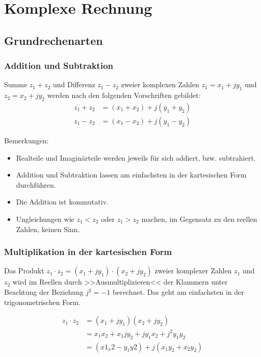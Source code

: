 \section{Komplexe Rechnung}
\subsection{Grundrechenarten}
\subsubsection*{Addition und Subtraktion}
\begin{definition}
Summe $z_1 + z_2$ und Differenz $z_1 - z_2$ zweier komplexen Zahlen $z_1 = x_1 + jy_1$ und $z_2 = x_2 + jy_2$ werden nach den folgenden Vorschriften gebildet:
\begin{align*}
z_1 + z_2 &= (x_1 + x_2) + j(y_1 + y_2)\\
z_1 - z_2 &= (x_1 - x_2) + j(y_1 - y_2)
\end{align*}
\end{definition}
Bemerkungen:
\begin{itemize}
	\item Realteile und Imaginärteile werden jeweils für sich addiert, bzw. subtrahiert.
	\item Addition und Subtraktion lassen am einfachsten in der kartesischen Form durchführen.
	\item Die Addition ist kommutativ.
	\item Ungleichungen wie $z_1 < z_2$ oder $z_1>z_2$ machen, im Gegensatz zu den reellen Zahlen, keinen Sinn.
\end{itemize}

\subsubsection*{Multiplikation in der kartesischen Form}
\begin{definition}
Das Produkt $z_1 \cdot z_2 = (x_1 + jy_1) \cdot (x_2 + jy_2)$ zweier komplexer Zahlen $z_1$ und $z_2$ wird im Reellen durch >>Ausmultiplizieren<< der Klammern unter Beachtung der Beziehung $j^2 = -1$ berechnet. Das geht am einfachsten in der trigonometrischen Form.
\end{definition}
\begin{bsp}
\begin{align*}
	z_1 \cdot z_2 	&= (x_1 + jy_1)(x_2 + jy_2) \\
							&= x_1x_2 + x_1jy_2 + jy_1x_2 + j^2y_1y_2\\
							&=(x1_x2 - y_1y2) + j(x_1y_2 + x_2y_2)
\end{align*}
\end{bsp}
